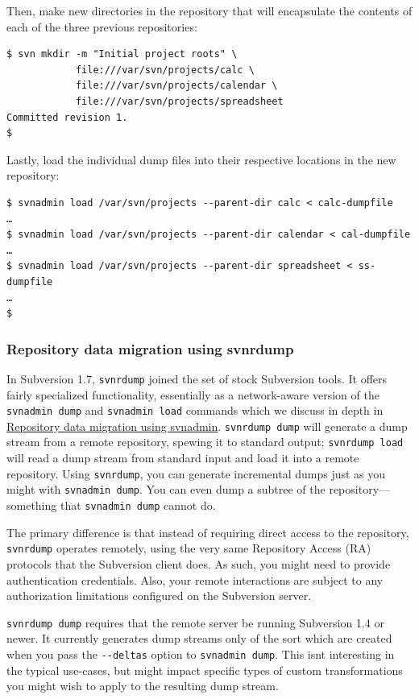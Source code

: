 Then, make new directories in the repository that will encapsulate the
contents of each of the three previous repositories:

\begin{verbatim}
$ svn mkdir -m "Initial project roots" \
            file:///var/svn/projects/calc \
            file:///var/svn/projects/calendar \
            file:///var/svn/projects/spreadsheet
Committed revision 1.
$ 
\end{verbatim}

Lastly, load the individual dump files into their respective locations
in the new repository:

\begin{verbatim}
$ svnadmin load /var/svn/projects --parent-dir calc < calc-dumpfile
…
$ svnadmin load /var/svn/projects --parent-dir calendar < cal-dumpfile
…
$ svnadmin load /var/svn/projects --parent-dir spreadsheet < ss-dumpfile
…
$
\end{verbatim}

\subsubsection{Repository data migration using
svnrdump}\label{svn.reposadmin.maint.migrate.svnrdump}

In Subversion 1.7, \texttt{svnrdump} joined the set of stock Subversion
tools. It offers fairly specialized functionality, essentially as a
network-aware version of the \texttt{svnadmin\ dump} and
\texttt{svnadmin\ load} commands which we discuss in depth in
\hyperref[svn.reposadmin.maint.migrate.svnadmin]{Repository data
migration using svnadmin}. \texttt{svnrdump\ dump} will generate a dump
stream from a remote repository, spewing it to standard output;
\texttt{svnrdump\ load} will read a dump stream from standard input and
load it into a remote repository. Using \texttt{svnrdump}, you can
generate incremental dumps just as you might with
\texttt{svnadmin\ dump}. You can even dump a subtree of the
repository---something that \texttt{svnadmin\ dump} cannot do.

The primary difference is that instead of requiring direct access to the
repository, \texttt{svnrdump} operates remotely, using the very same
Repository Access (RA) protocols that the Subversion client does. As
such, you might need to provide authentication credentials. Also, your
remote interactions are subject to any authorization limitations
configured on the Subversion server.

\texttt{svnrdump\ dump} requires that the remote server be running
Subversion 1.4 or newer. It currently generates dump streams only of the
sort which are created when you pass the \texttt{-\/-deltas} option to
\texttt{svnadmin\ dump}. This isn\textquotesingle t interesting in the
typical use-cases, but might impact specific types of custom
transformations you might wish to apply to the resulting dump stream.

